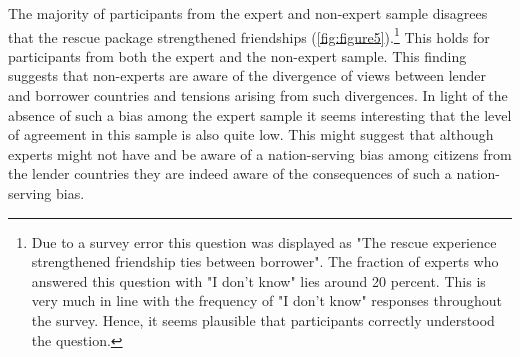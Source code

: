 The majority of participants from the expert and non-expert sample disagrees that 
the rescue package strengthened friendships (\autoref{fig:figure5}).\footnote{Due to a survey error this question was displayed as "The rescue experience strengthened friendship ties between borrower". The fraction of experts who answered this question with "I don't know" lies around 20 percent. This is very much in line with the frequency of "I don't know" responses throughout the survey. Hence, it seems plausible that participants correctly understood the question. } This holds for participants from 
both the expert and the non-expert sample. This finding suggests that non-experts are aware of the divergence of views between lender and borrower countries and tensions arising from such divergences. In light of the absence of such a bias among the expert sample 
it seems interesting that the level of agreement in this sample is also quite low. 
This might suggest that although experts might not have and be aware of a nation-serving bias
among citizens from the lender countries they are indeed aware of the consequences of such 
a nation-serving bias. 

